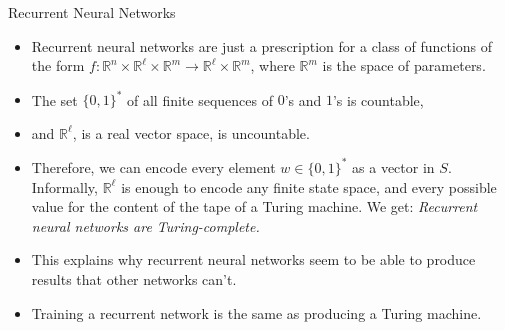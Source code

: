 \documentclass[10pt]{beamer}
\newcommand{\R}{\mathbb{R}}
\begin{document}

\begin{frame}{Recurrent Neural Networks}
  \begin{itemize}
  \item Recurrent neural networks are just a prescription for a class of functions of the form $f:\R^n\times \R^\ell\times\R^m\to \R^\ell\times \R^m$, where $\R^m$ is the space of parameters.
  \item The set $\{0, 1\}^*$ of all finite sequences of $0$'s and $1$'s is countable,
  \item and $\R^\ell$, is a real vector space,
  is uncountable.
  \item Therefore, we can encode every element $w\in\{0, 1\}^*$ as a vector in $S$.  Informally,
  $\R^\ell$ is enough to encode any finite state space, and every possible value for the content of the tape of a Turing machine. We get:
  {\em Recurrent neural networks are Turing-complete.}
  \item This explains why recurrent neural networks seem to be able to produce results that other networks can't.
  \item Training a recurrent network is the same as producing a Turing machine.
\end{itemize}
\end{frame}
\end{document}

